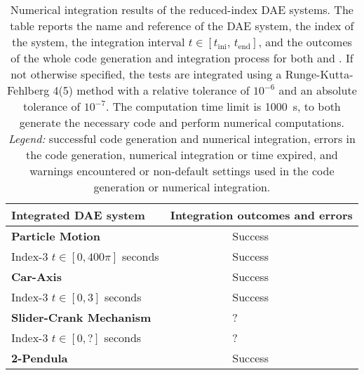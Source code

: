 \setlength\tabcolsep{2.5pt}
\setlength{\LTcapwidth}{\textwidth}
{\footnotesize\centering\begin{longtable}{lccl}
  \caption{Numerical integration results of the reduced-index \ac{DAE} systems. The table reports the name and reference of the \ac{DAE} system, the index of the system, the integration interval $t \in [t_{\text{ini}}, \, t_{\text{end}}]$, and the outcomes of the whole code generation and integration process for both \Maple{} and \Indigo{}. If not otherwise specified, the tests are integrated using a Runge-Kutta-Fehlberg 4(5) method with a relative tolerance of $10^{-6}$ and an absolute tolerance of $10^{-7}$. The computation time limit is \SI{1000}{\second}, to both generate the necessary code and perform numerical computations. \emph{Legend:} \mycheckmark{} successful code generation and numerical integration, \mycrossmark{} errors in the code generation, numerical integration or time expired, and \mywarnmark{} warnings encountered or non-default settings used in the code generation or numerical integration.}
  \label{chap3:tab:numerical_integration}
  \endfirsthead
  \endhead
  \toprule
  \textbf{Integrated \ac{DAE} system} &
  \multicolumn{3}{l}{\textbf{Integration outcomes and errors}} \\
  \midrule
  \multirow{1}{*}{\textbf{Particle Motion~\cite{campbell1995constraint}}}
    & \Maple{}  & \mycheckmark{}\phantom{\mywarnmark{}} & Success \\ \cmidrule(l{4pt}){2-4}
    Index-3 \quad $t \in [0, 400\pi]$ seconds & \Indigo{} & \mycheckmark{}\phantom{\mywarnmark{}} & Success \\ \midrule
  \multirow{1}{*}{\textbf{Car-Axis~\cite{lioen1998test, mazzia2008test}}}
    & \Maple{}  & \mycheckmark{}\phantom{\mywarnmark{}} & Success \\ \cmidrule(l{4pt}){2-4}
    Index-3 \quad $t \in [0, 3]$ seconds & \Indigo{} & \mycheckmark{}\phantom{\mywarnmark{}} & Success \\ \midrule
    \multirow{1}{*}{\textbf{Slider-Crank Mechanism~\cite{lioen1998test, mazzia2008test}}}
    & \Maple{}  & \mycheckmark{}\phantom{\mywarnmark{}} & ? \\ \cmidrule(l{4pt}){2-4}
    Index-3 \quad $t \in [0, ?]$ seconds & \Indigo{} & \mycheckmark{}\phantom{\mywarnmark{}} & ? \\ \midrule
  \multirow{1}{*}{\textbf{2-Pendula~\cite{pryce1998solving}}}
    & \Maple{}  & \mycheckmark{}\phantom{\mywarnmark{}} & Success \\ \cmidrule(l{4pt}){2-4}

\end{longtable}}
